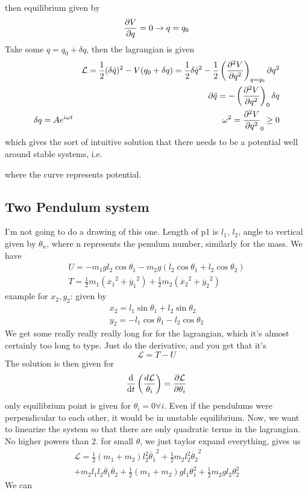 \documentclass{article} \usepackage{amsmath} \usepackage{amssymb} \usepackage{amsthm} \usepackage[margin=0.2in]{geometry} \usepackage{hyperref} \usepackage{physics} \usepackage{tikz} \usepackage{mathtools} \mathtoolsset{showonlyrefs} \theoremstyle{definition} \newtheorem{theorem}{Theorem}[section] \newtheorem{corollary}{Corollary}[theorem] \newtheorem{lemma}[theorem]{Lemma} \newtheorem{definition}{Definition}[section] \author{Connor Duncan} \date{\today}
\begin{document}
then equilibrium given by \begin{equation} \pdv{V}{q}=0\rightarrow q=q_0 \end{equation} Take some $q=q_0+\delta q$, then the lagrangian is given \begin{align} && \mathcal{L}=\frac{1}{2}(\delta\dot q)^2-V(q_0+\delta q)= \frac{1}{2}\delta\dot{q}^2-\frac{1}{2}\left(\pdv[2]{V}{q}\right)_{q=q_0}\partial q^2\\ && \partial \ddot q=-\left(\pdv[2]{V}{q}\right)_0\delta q\\ \delta q=Ae^{i\omega t} && \omega^2=\pdv[2]{V}{q}_0\geq 0 \end{align} which gives the sort of intuitive solution that there needs to be a potential well around stable systems, i.e. \begin{center}  \end{center} where the curve represents potential. \subsection{Two Pendulum system} I'm not going to do a drawing of this one. Length of p1 is $l_1$, $l_2$, angle to vertical given by $\theta_n$, where n represents the penulum number, similarly for the mass. We have \begin{align} U=-m_1gl_2\cos\theta_1-m_2g(l_2\cos\theta_1+l_2\cos\theta_2)\\ T=\frac{1}{2}m_1(\dot{x_1}^2+\dot{y_1}^2)+\frac{1}{2}m_2(\dot{x_2}^2+\dot{y_2}^2) \end{align} example for $x_2,y_2$: given by \begin{align} x_2=l_1\sin\theta_1+l_2\sin\theta_2\\ y_2=-l_1\cos\theta_1-l_2\cos\theta_2 \end{align} We get some really really really long for for the lagrangian, which it's almost certainly too long to type. Just do the derivative, and you get that it's \begin{equation} \mathcal L=T-U \end{equation} The solution is then given for \begin{equation} \dv{}{t}\left(\frac{d\mathcal L}{\theta_i}\right)=\pdv{\mathcal{L}}{\theta_i} \end{equation} only equilibrium point is given for $\theta_i=0\forall i$. Even if the pendulums were perpendicular to each other, it would be in unstable equilibrium. Now, we want to linearize the system so that there are only quadratic terms in the lagrangian. No higher powers than 2. for small $\theta$, we just taylor expand everything, gives us \begin{align} \mathcal L=\frac{1}{2}(m_1+m_2)l_2^2\dot{\theta_1}^2+\frac{1}{2}m_2l_2^2\dot{\theta_2}^2\\ +m_2l_1l_2\dot{\theta_1}\dot{\theta_2}+\frac{1}{2}(m_1+m_2)gl_1\theta_1^2+\frac{1}{2}m_2gl_2\theta_2^2 \end{align} We can 
\end{document}
